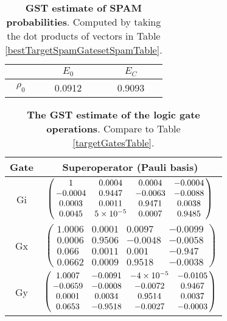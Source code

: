 {\begin{table}[h]
\begin{center}
\begin{tabular}[l]{|c|c|c|}
\hline
 & $E_{0}$ & $E_C$ \\ \hline
$\rho_{0}$ & 0.0912 & 0.9093 \\ \hline
\end{tabular}

\caption{\textbf{GST estimate of SPAM probabilities}.  Computed by taking the dot products of vectors in Table \ref{bestTargetSpamGatesetSpamTable}.\label{bestTargetSpamGatesetSpamParametersTable}}
\end{center}
\end{table}

\begin{table}[h]
\begin{center}
\begin{tabular}[l]{|c|c|}
\hline
Gate & Superoperator (Pauli basis) \\ \hline
Gi & $ \left(\!\!\begin{array}{cccc}
1 & 0.0004 & 0.0004 & -0.0004 \\ 
-0.0004 & 0.9447 & -0.0063 & -0.0088 \\ 
0.0003 & 0.0011 & 0.9471 & 0.0038 \\ 
0.0045 & 5\times 10^{-5} & 0.0007 & 0.9485
 \end{array}\!\!\right) $
 \\ \hline
Gx & $ \left(\!\!\begin{array}{cccc}
1.0006 & 0.0001 & 0.0097 & -0.0099 \\ 
0.0006 & 0.9506 & -0.0048 & -0.0058 \\ 
0.066 & 0.0011 & 0.001 & -0.947 \\ 
0.0662 & 0.0009 & 0.9518 & -0.0038
 \end{array}\!\!\right) $
 \\ \hline
Gy & $ \left(\!\!\begin{array}{cccc}
1.0007 & -0.0091 & -4\times 10^{-5} & -0.0105 \\ 
-0.0659 & -0.0008 & -0.0072 & 0.9467 \\ 
0.0001 & 0.0034 & 0.9514 & 0.0037 \\ 
0.0653 & -0.9518 & -0.0027 & -0.0003
 \end{array}\!\!\right) $
 \\ \hline
\end{tabular}

\caption{\textbf{The GST estimate of the logic gate operations}.  Compare to Table \ref{targetGatesTable}.\label{bestTargetSpamGatesetGatesTable}}
\end{center}
\end{table}

}
